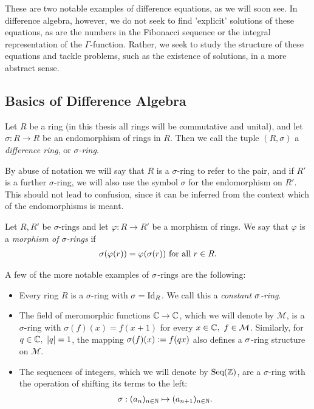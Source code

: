 These are two notable examples of difference equations, as we will soon see. In difference algebra, however, we do not seek to find 'explicit' solutions of these equations,
 as are the numbers in the Fibonacci sequence or the integral representation of the $\Gamma$-function. Rather, we seek to study the structure of these equations and tackle problems, such as the existence of solutions, in a more abstract sense.

\subsection{Basics of Difference Algebra}\label{fundamentos}
\begin{defn}
Let  $R$ be a ring (in this thesis all rings will be commutative and unital), and let
 $\sigma: R \rightarrow R$ be an endomorphism of rings in $R$. Then we call the tuple $(R,\sigma)$ a \emph{difference ring}, or $\sigma$\emph{-ring}.  \\
\end{defn}
By abuse of notation we will say that $R$ is a $\sigma$-ring  to refer to the pair, and if $R'$ is a further $\sigma$-ring, we will also use the symbol $\sigma$ for the endomorphism on $R'$. This should not lead to confusion, since it can be inferred from the context which of the endomorphisms is meant. 


\begin{defn}
Let $R, R'$ be  $\sigma$-rings and let $\varphi: R \rightarrow R'$ be a morphism of rings. We say that $\varphi$ is a \emph{morphism of $\sigma$-rings}  if 
\begin{align*}
\sigma(\varphi(r)) = \varphi(\sigma(r)) \text{ for all } r \in R.
\end{align*}
\end{defn}

\begin{ex} A few of the more notable examples of $\sigma$-rings are the following:

\begin{itemize}
\item Every ring $R$ is a $\sigma$-ring with $\sigma = \text{Id}_R$. We call this a \emph{constant $\sigma$-ring}.  
\item The field of meromorphic functions $\mathbb{C} \rightarrow \mathbb{C}$, which we will denote by $\mathcal{M}$,
is a $\sigma$-ring with $\sigma(f)(x) = f(x+1)$ for every $x \in \mathbb{C}, ~ f \in \mathcal{M}$.
Similarly, for $q \in \mathbb{C}, ~ |q| = 1$, the mapping $\sigma(f)(x) := f(qx)$ also defines a $\sigma$-ring structure on $\mathcal{M}$.
\item The sequences of integers, which we will denote by $\text{Seq}(\mathbb{Z})$, are a $\sigma$-ring with the operation of shifting its terms to the left:
\begin{align*} \sigma: (a_n)_{n \in \mathbb{N}} \mapsto (a_{n+1})_{n \in \mathbb{N}}. \end{align*}
\end{itemize}
\end{ex}

